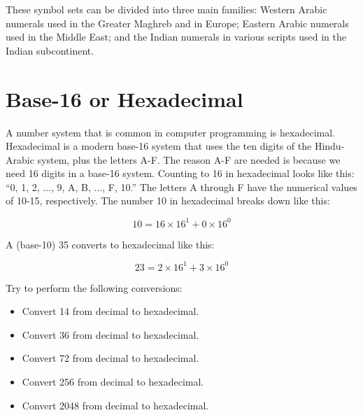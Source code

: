 \documentclass[12pt]{article}
\begin{document}
These symbol sets can be divided into three main families: Western Arabic numerals used in the Greater Maghreb and in Europe; Eastern Arabic numerals used in the Middle East; and the Indian numerals in various scripts used in the Indian subcontinent.

\section{Base-16 or Hexadecimal}

A number system that is common in computer programming is hexadecimal.  Hexadecimal is a modern base-16 system that uses the ten digits of the Hindu-Arabic system, plus the letters A-F.  The reason A-F are needed is because we need 16 digits in a base-16 system.  Counting to 16 in hexadecimal looks like this: ``0, 1, 2, ..., 9, A, B, ..., F, 10.''  The letters A through F have the numerical values of 10-15, respectively.  The number 10 in hexadecimal breaks down like this:

\begin{equation}
10 = 16 \times 16^1 + 0 \times 16^0
\end{equation}

A (base-10) 35 converts to hexadecimal like this:

\begin{equation}
23 = 2 \times 16^1 + 3 \times 16^0
\end{equation}

Try to perform the following conversions:

\begin{itemize}
\item Convert 14 from decimal to hexadecimal. \\ \vspace{1cm}
\item Convert 36 from decimal to hexadecimal. \\ \vspace{1cm}
\item Convert 72 from decimal to hexadecimal. \\ \vspace{1cm}
\item Convert 256 from decimal to hexadecimal. \\ \vspace{1cm}
\item Convert 2048 from decimal to hexadecimal. \\ \vspace{1cm}
\end{itemize}
\end{document}
